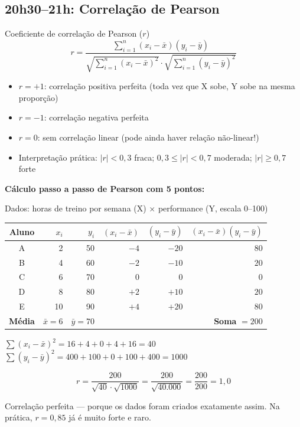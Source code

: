 \subsection{20h30–21h: Correlação de Pearson}

\begin{FormulaBox}{Coeficiente de correlação de Pearson ($r$)}
\[
r = \frac{\sum_{i=1}^{n}(x_i - \bar{x})(y_i - \bar{y})}
         {\sqrt{\sum_{i=1}^{n}(x_i - \bar{x})^2} \cdot \sqrt{\sum_{i=1}^{n}(y_i - \bar{y})^2}}
\]
\begin{itemize}
  \item $r = +1$: correlação positiva perfeita (toda vez que X sobe, Y sobe na mesma proporção)
  \item $r = -1$: correlação negativa perfeita
  \item $r = 0$: sem correlação linear (pode ainda haver relação não-linear!)
  \item Interpretação prática: $|r| < 0{,}3$ fraca; $0{,}3 \leq |r| < 0{,}7$ moderada;
  $|r| \geq 0{,}7$ forte
\end{itemize}
\end{FormulaBox}

\begin{SolvedBox}
\textbf{Cálculo passo a passo de Pearson com 5 pontos:}

Dados: horas de treino por semana (X) × performance (Y, escala 0–100)

\begin{center}
\begin{tabular}{|c|r|r|r|r|r|}
\hline
Aluno & $x_i$ & $y_i$ & $(x_i-\bar{x})$ & $(y_i-\bar{y})$ & $(x_i-\bar{x})(y_i-\bar{y})$ \\
\hline
A & 2 & 50 & $-4$ & $-20$ & $80$ \\
B & 4 & 60 & $-2$ & $-10$ & $20$ \\
C & 6 & 70 & $0$ & $0$ & $0$ \\
D & 8 & 80 & $+2$ & $+10$ & $20$ \\
E & 10 & 90 & $+4$ & $+20$ & $80$ \\
\hline
\textbf{Média} & $\bar{x}=6$ & $\bar{y}=70$ & & & \textbf{Soma} $= 200$ \\
\hline
\end{tabular}
\end{center}

$\sum(x_i - \bar{x})^2 = 16+4+0+4+16 = 40$\\
$\sum(y_i - \bar{y})^2 = 400+100+0+100+400 = 1000$

\[
r = \frac{200}{\sqrt{40} \cdot \sqrt{1000}} = \frac{200}{\sqrt{40.000}} = \frac{200}{200} = 1{,}0
\]

Correlação perfeita — porque os dados foram criados exatamente assim.
Na prática, $r = 0{,}85$ já é muito forte e raro.
\end{SolvedBox}

